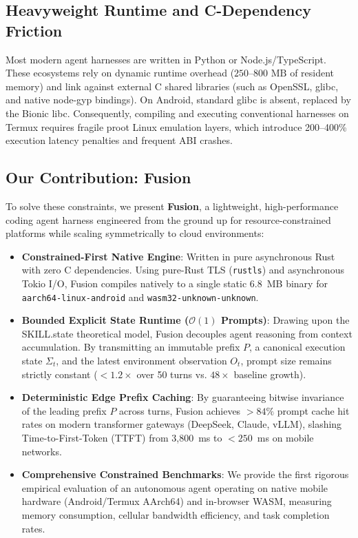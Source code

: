 \subsection{Heavyweight Runtime and C-Dependency Friction}
Most modern agent harnesses are written in Python or Node.js/TypeScript. These ecosystems rely on dynamic runtime overhead ($250\text{--}800\text{ MB}$ of resident memory) and link against external C shared libraries (such as OpenSSL, glibc, and native node-gyp bindings). On Android, standard glibc is absent, replaced by the Bionic libc. Consequently, compiling and executing conventional harnesses on Termux requires fragile proot Linux emulation layers, which introduce 200--400\% execution latency penalties and frequent ABI crashes.

\subsection{Our Contribution: Fusion}
To solve these constraints, we present \textbf{Fusion}, a lightweight, high-performance coding agent harness engineered from the ground up for resource-constrained platforms while scaling symmetrically to cloud environments:
\begin{itemize}
    \item \textbf{Constrained-First Native Engine}: Written in pure asynchronous Rust with zero C dependencies. Using pure-Rust TLS (\texttt{rustls}) and asynchronous Tokio I/O, Fusion compiles natively to a single static 6.8~MB binary for \texttt{aarch64-linux-android} and \texttt{wasm32-unknown-unknown}.
    \item \textbf{Bounded Explicit State Runtime ($\mathcal{O}(1)$ Prompts)}: Drawing upon the SKILL.state theoretical model, Fusion decouples agent reasoning from context accumulation. By transmitting an immutable prefix $P$, a canonical execution state $\Sigma_t$, and the latest environment observation $O_t$, prompt size remains strictly constant ($<1.2\times$ over 50 turns vs. $48\times$ baseline growth).
    \item \textbf{Deterministic Edge Prefix Caching}: By guaranteeing bitwise invariance of the leading prefix $P$ across turns, Fusion achieves $>84\%$ prompt cache hit rates on modern transformer gateways (DeepSeek, Claude, vLLM), slashing Time-to-First-Token (TTFT) from 3,800~ms to $<250$~ms on mobile networks.
    \item \textbf{Comprehensive Constrained Benchmarks}: We provide the first rigorous empirical evaluation of an autonomous agent operating on native mobile hardware (Android/Termux AArch64) and in-browser WASM, measuring memory consumption, cellular bandwidth efficiency, and task completion rates.
\end{itemize}
